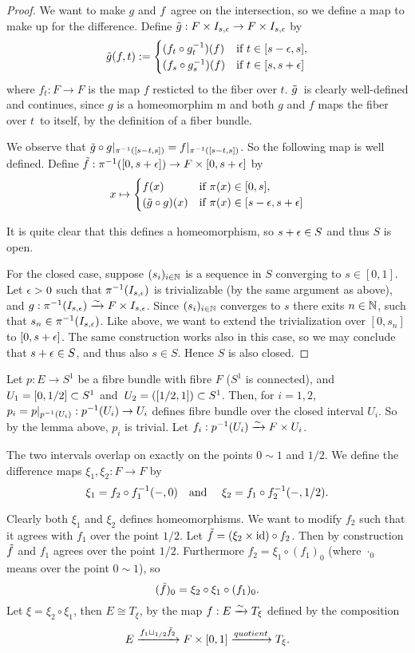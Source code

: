 \documentclass[a4paper,11pt,english]{article}
\begin{document}
\begin{exercise}[3]
\begin{proof}
We want to make $g$ and $f$ agree on the intersection, so we define a map to
make up for the difference. Define $\til g: F\times \Bes \to F\times\Bes$ by
\[ \til g(f,t) := \pwf{
(f_t \circ g_t\i)(f) &\tif t\in[s-\eps, s], \\
(f_s \circ g_s\i)(f) &\tif t\in[s, s+\eps] } \]
where $f_t : F \to F$ is the map $f$ resticted to the fiber over $t$.
$\til g$ is clearly well-defined and continues, since $g$ is a homeomorphim
m and
both $g$ and $f$ maps the fiber over $t$ to itself, by the definition of a fiber
bundle.

We observe that $\til g\circ g|_{\pi\i([s-t,s])} = f|_{\pi\i([s-t,s])}$. So
the following map is well defined. Define $\til f: \pi\i([0,s+\eps]) \to F\times
[0,s+\eps]$ by
\[ x \mapsto \pwf{
f(x) &\tif \pi(x) \in [0,s], \\
(\til g \circ g)(x) &\tif \pi(x) \in [s-\eps,s+\eps] } \]

It is quite clear that this defines a homeomorphism, so $s + \eps \in S$ and
thus $S$ is open.

For the closed case, suppose $(s_i)_{i\in \N}$ is a sequence in $S$ converging
to $s \in [0,1]$. Let $\eps > 0$ such that $\pi\i(\Bes)$ is trivializable (by
the same argument as above), and $g : \pi\i(\Bes) \congto F \times \Bes$. Since
$(s_i)_{i\in \N}$ converges to $s$ there exits $n \in \N$, such that $s_n \in
\pi\i(\Bes)$. Like above, we want to extend the trivialization over $[0,s_n]$ to
$[0,s+\eps]$.
The same construction works also in this case, so we may conclude that
$s+\eps\in S$, and thus also $s\in S$. Hence $S$ is also closed.
\end{proof}

Let $p : E \to S^1$ be a fibre bundle with fibre $F$ ($S^1$ is connected), and
$U_1 = [0, 1/2] \ss S^1$ and $U_2 = ([1/2,1]) \ss S^1$. Then, for $i=1,2$, 
$p_i = p|_{p\i(U_i)} : p\i(U_i) \to U_i$ defines fibre bundle over the closed
interval $U_i$. So by the lemma above, $p_i$ is trivial. Let $f_i : p\i(U_i)
\congto F \times U_i$.

The two intervals overlap on exactly on the points $0 \sim 1$ and $1/2$. We define
the difference maps $\xi_1, \xi_2: F \to F$ by
\[ \xi_1 = f_2 \circ f_1\i(-,0) \qq\tand
\xi_2 = f_1 \circ f_2\i(-,1/2). \]

Clearly both $\xi_1$ and $\xi_2$ defines homeomorphisms. We want to modify $f_2$
such that it agrees with $f_1$ over the point $1/2$.
Let $\til f = (\xi_2 \times \id) \circ f_2$. Then by construction $\til f$ and
$f_1$ agrees over the point $1/2$. Furthermore $f_2 = \xi_1 \circ (f_1)_0$
(where $\cdot_0$ means over the point $0\sim 1$), so
\[ (\til f)_0 = \xi_2 \circ \xi_1 \circ (f_1)_0. \]
Let $\xi = \xi_2 \circ \xi_1$, then $E \cong T_\xi$, by the map $f : E \congto
T_\xi$ defined by the composition
\[ E \xto{ f_1 \sqcup_{1/2} \til f_2 } F \times [0,1]
\xto{quotient} T_\xi. \]

\end{exercise}
\end{document}
